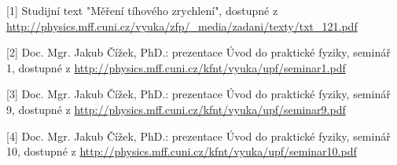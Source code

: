\documentclass[protokol.tex]{subfiles}
\begin{document}
[1] Studijní text "Měření tíhového zrychlení", dostupné z\\ \url{http://physics.mff.cuni.cz/vyuka/zfp/_media/zadani/texty/txt_121.pdf}

[2] Doc. Mgr. Jakub Čížek, PhD.: prezentace Úvod do praktické fyziky, seminář 1, dostupné z \url{http://physics.mff.cuni.cz/kfnt/vyuka/upf/seminar1.pdf}

[3] Doc. Mgr. Jakub Čížek, PhD.: prezentace Úvod do praktické fyziky, seminář 9, dostupné z \url{http://physics.mff.cuni.cz/kfnt/vyuka/upf/seminar9.pdf}

[4] Doc. Mgr. Jakub Čížek, PhD.: prezentace Úvod do praktické fyziky, seminář 10, dostupné z \url{http://physics.mff.cuni.cz/kfnt/vyuka/upf/seminar10.pdf}
\end{document}

